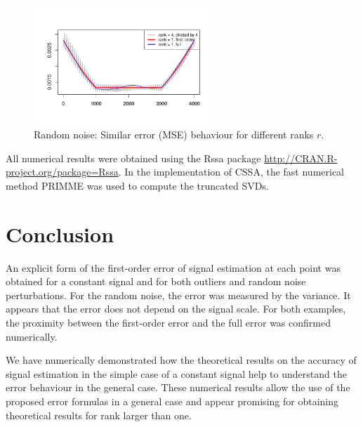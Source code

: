 \documentclass[engproc, submit, article,pdftex,moreauthors]{Definitions/mdpi}
\begin{document}
\begin{figure}[!htb]
    \centering
        \includegraphics[width=0.6\textwidth]{img/const_noise_err_14}
    \caption{Random noise: Similar error (MSE) behaviour for different ranks $r$.}
    \label{fig:noise}
\end{figure}

All numerical results were obtained using the Rssa package \url{http://CRAN.R-project.org/package=Rssa}. In the implementation of CSSA, the fast numerical method PRIMME was used to compute the truncated SVDs.

\section{Conclusion}
An explicit form of the first-order error of signal estimation at each point was obtained for a constant signal and for both outliers and random noise perturbations. For the random noise, the error was measured by the variance.
It appears that the error does not depend on the signal scale.
For both examples, the proximity between the first-order error and the full error was confirmed numerically.

We have numerically demonstrated how the theoretical results on the accuracy of signal estimation in the simple case of a constant signal help to understand the error behaviour in the general case.
These numerical results allow the use of the proposed error formulas in a general case and appear promising for obtaining theoretical results for rank larger than one.




	
\end{document}
